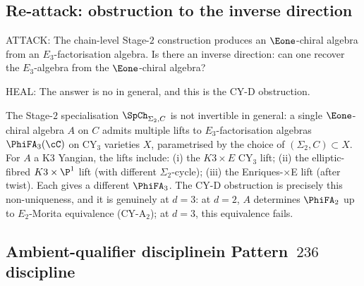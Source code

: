 \subsection{Re-attack: obstruction to the inverse direction}
\label{wn:subsec:agent3-inverse-direction}

ATTACK: The chain-level Stage-$2$ construction produces an $\Eone$-chiral algebra from an $E_3$-factorisation algebra. Is there an inverse direction: can one recover the $E_3$-algebra from the $\Eone$-chiral algebra?

HEAL: The answer is no in general, and this is the CY-D obstruction.

\begin{remark}
\label{wn:rem:agent3-cyd-obstruction}
\ClaimStatusProvedElsewhere{}
The Stage-$2$ specialisation $\SpCh_{\Sigma_2,C}$ is not invertible in general: a single $\Eone$-chiral algebra $A$ on $C$ admits multiple lifts to $E_3$-factorisation algebras $\PhiFA_3(\cC)$ on CY$_3$ varieties $X$, parametrised by the choice of $(\Sigma_2,C)\subset X$. For $A$ a K3 Yangian, the lifts include: (i) the $K3\times E$ CY$_3$ lift; (ii) the elliptic-fibred $K3\times\P^1$ lift (with different $\Sigma_2$-cycle); (iii) the Enriques-$\times$E lift (after twist). Each gives a different $\PhiFA_3$. The CY-D obstruction is precisely this non-uniqueness, and it is genuinely at $d=3$: at $d=2$, $A$ determines $\PhiFA_2$ up to $E_2$-Morita equivalence (CY-A$_2$); at $d=3$, this equivalence fails.
\end{remark}

\subsection{Ambient-qualifier disciplinein Pattern~$236$ discipline}
\label{wn:subsec:agent3-ambient-qualifier}

